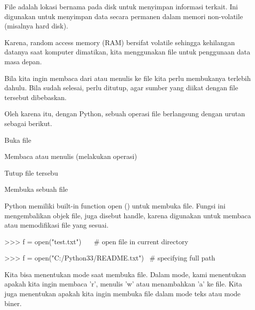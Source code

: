 \vspace{12pt}
\vspace{12pt}
\vspace{14pt}
\noindent 
File adalah lokasi bernama pada disk untuk menyimpan informasi terkait. Ini digunakan untuk menyimpan data secara permanen dalam memori non-volatile (misalnya hard disk). \par
\noindent 
\vspace{12pt}
\noindent 
Karena, random access memory (RAM) bersifat volatile sehingga kehilangan datanya saat komputer dimatikan, kita menggunakan file untuk penggunaan data masa depan. \par
\noindent 
\vspace{12pt}
\noindent 
Bila kita ingin membaca dari atau menulis ke file kita perlu membukanya terlebih dahulu. Bila sudah selesai, perlu ditutup, agar sumber yang diikat dengan file tersebut dibebaskan. \par
\noindent 
\vspace{12pt}
\noindent 
Oleh karena itu, dengan Python, sebuah operasi file berlangsung dengan urutan sebagai berikut. \par
\vspace{12pt}
\noindent 
\begin{myEnumerate}
\item Buka file \par
\noindent 
\item Membaca atau menulis (melakukan operasi) \par
\noindent 
\item Tutup file tersebu\end{myEnumerate}
 \par
\vspace{12pt}
\vspace{12pt}
\vspace{12pt}
\noindent 
Membuka sebuah file \par
\noindent 
Python memiliki built-in function open () untuk membuka file. Fungsi ini mengembalikan objek file, juga disebut handle, karena digunakan untuk membaca atau memodifikasi file yang sesuai. \par
\vspace{12pt}
\noindent 
>>> f = open("test.txt")~~~  $  \#  $ open file in current directory \par
\noindent 
>>> f = open("C:/Python33/README.txt")~  $  \#  $ specifying full path \par
\vspace{12pt}
\noindent 
Kita bisa menentukan mode saat membuka file. Dalam mode, kami menentukan apakah kita ingin membaca 'r', menulis 'w' atau menambahkan 'a' ke file. Kita juga menentukan apakah kita ingin membuka file dalam mode teks atau mode biner. \par
